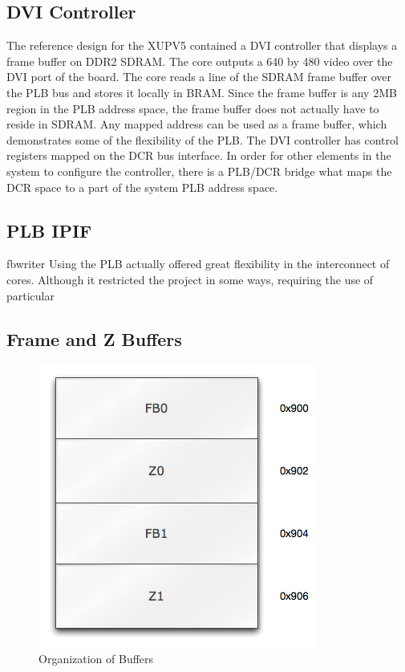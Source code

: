 \documentclass[letterpaper,10pt]{article}
\begin{document}
\subsection{DVI Controller}
The reference design for the XUPV5 contained a DVI controller that displays a frame buffer on DDR2 SDRAM.  The core outputs a 640 by 480 video over the DVI port of the board.  The core reads a line of the SDRAM frame buffer over the PLB bus and stores it locally in BRAM. Since the frame buffer is any 2MB region in the PLB address space, the frame buffer does not actually have to reside in SDRAM.  Any mapped address can be used as a frame buffer, which demonstrates some of the flexibility of the PLB.  The DVI controller has control registers mapped on the DCR bus interface.  In order for other elements in the system to configure the controller, there is a PLB/DCR bridge what maps the DCR space to a part of the system PLB address space.


\subsection{PLB IPIF}
fbwriter
Using the PLB actually offered great flexibility in the interconnect of cores.  Although it restricted the project in some ways, requiring the use of particular 

\subsection{Frame and Z Buffers}

\begin{figure}[htb]
\begin{center}
\includegraphics[scale=.68]{buffer_space.png}
\end{center}
\caption{Organization of Buffers}
\label{fig:buffer_space}
\end{figure}
\end{document}
